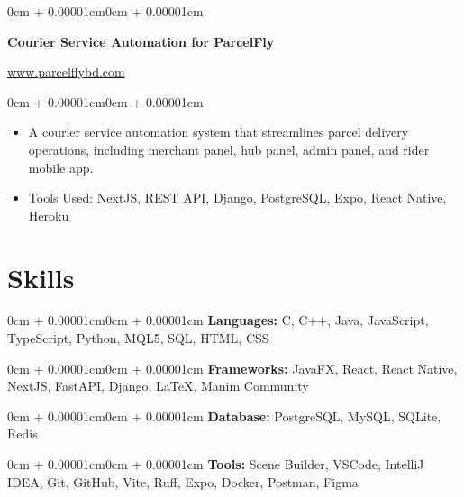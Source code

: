 \documentclass[10pt, letterpaper]{article}
\newenvironment{highlights}{
  \begin{itemize}[
    topsep=0.10cm,
    parsep=0.10cm,
    partopsep=0pt,
    itemsep=0pt,
    leftmargin=0cm + 10pt
  ]
}{
  \end{itemize}
}
\newenvironment{onecolentry}{\begin{adjustwidth}{0cm + 0.00001cm}{0cm + 0.00001cm}}{\end{adjustwidth}}
\newenvironment{twocolentry}[2][]{
  \onecolentry
  \def\secondColumn{#2}
  \setcolumnwidth{\fill, 4.5cm}
  \begin{paracol}{2}
}{
  \switchcolumn \raggedleft \secondColumn
  \end{paracol}
  \endonecolentry
}
\begin{document}
\vspace{0.2cm}

\begin{twocolentry}{\href{https://www.parcelflybd.com/}{www.parcelflybd.com}}
  \textbf{Courier Service Automation for ParcelFly}
\end{twocolentry}

\vspace{0.10cm}

\begin{onecolentry}
  \begin{highlights}
    \item A courier service automation system that streamlines parcel delivery operations, including merchant panel, hub panel, admin panel, and rider mobile app.
    \item Tools Used: NextJS, REST API, Django, PostgreSQL, Expo, React Native, Heroku
  \end{highlights}
\end{onecolentry}

\section{Skills}

\begin{onecolentry}
  \textbf{Languages:} C, C++, Java, JavaScript, TypeScript, Python, MQL5, SQL, HTML, CSS
\end{onecolentry}

\vspace{0.2cm}

\begin{onecolentry}
  \textbf{Frameworks:} JavaFX, React, React Native, NextJS, FastAPI, Django, LaTeX, Manim Community
\end{onecolentry}

\vspace{0.2cm}

\begin{onecolentry}
  \textbf{Database:} PostgreSQL, MySQL, SQLite, Redis
\end{onecolentry}

\vspace{0.2cm}

\begin{onecolentry}
  \textbf{Tools:} Scene Builder, VSCode, IntelliJ IDEA, Git, GitHub, Vite, Ruff, Expo, Docker, Postman, Figma
\end{onecolentry}
\end{document}
